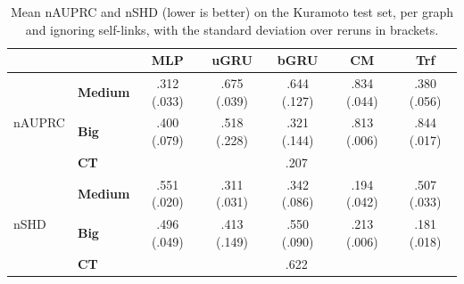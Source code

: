 \begin{table}[ht]
    \centering
    \begin{tabular}{llccccc}
    \toprule
        & & \textbf{MLP} & \textbf{uGRU} & \textbf{bGRU} & \textbf{CM} & \textbf{Trf} \\
    \midrule
        \multirow{3}{*}{nAUPRC} & \textbf{Medium} & .312 (.033) & .675 (.039) & .644 (.127) & .834 (.044) & .380 (.056) \\
        ~ & \textbf{Big} & .400 (.079) & .518 (.228) & .321 (.144) & .813 (.006) & .844 (.017) \\
        ~ & \textbf{CT} & \multicolumn{5}{c}{.207} \\
    \midrule
        \multirow{3}{*}{nSHD} & \textbf{Medium} & .551 (.020) & .311 (.031) & .342 (.086) & .194 (.042) & .507 (.033) \\
        ~ & \textbf{Big} & .496 (.049) & .413 (.149) & .550 (.090) & .213 (.006) & .181 (.018) \\
        ~ & \textbf{CT} & \multicolumn{5}{c}{.622} \\
    \bottomrule
    \end{tabular}
    \caption{Mean nAUPRC and nSHD (lower is better) on the Kuramoto test set, per graph and ignoring self-links, with the standard deviation over reruns in brackets.}
\label{tab:cp:kuramoto}
\end{table}
